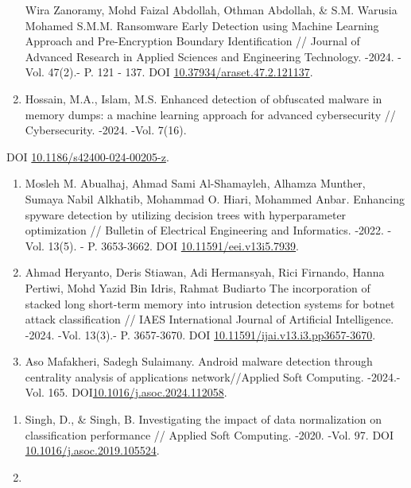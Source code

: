 \begin{references}
\begin{enumerate}
  Wira Zanoramy, Mohd Faizal Abdollah, Othman Abdollah, \& S.M. Warusia
  Mohamed S.M.M. Ransomware Early Detection using Machine Learning
  Approach and Pre-Encryption Boundary Identification // Journal of
  Advanced Research in Applied Sciences and Engineering Technology.
  -2024. -Vol. 47(2).- P. 121 - 137. DOI
  \href{https://doi.org/10.37934/araset.47.2.121137}{10.37934/araset.47.2.121137}.
\item
  Hossain, M.A., Islam, M.S. Enhanced detection of obfuscated malware in
  memory dumps: a machine learning approach for advanced cybersecurity
  // Cybersecurity. -2024. -Vol. 7(16).
\end{enumerate}
DOI \href{https://doi.org/10.1186/s42400-024-00205-z}{10.1186/s42400-024-00205-z}.

\begin{enumerate}
\def\labelenumi{\arabic{enumi}.}
\setcounter{enumi}{8}
\item
  Mosleh M. Abualhaj, Ahmad Sami Al-Shamayleh, Alhamza Munther, Sumaya
  Nabil Alkhatib, Mohammad O. Hiari, Mohammed Anbar\emph{.} Enhancing
  spyware detection by utilizing decision trees with hyperparameter
  optimization // Bulletin of Electrical Engineering and Informatics.
  -2022. -Vol. 13(5). - P. 3653-3662. DOI
  \href{https://doi.org/10.11591/eei.v13i5.7939}{10.11591/eei.v13i5.7939}.
\item
  Ahmad Heryanto, Deris Stiawan, Adi Hermansyah, Rici Firnando, Hanna
  Pertiwi, Mohd Yazid Bin Idris, Rahmat Budiarto The incorporation of
  stacked long short-term memory into intrusion detection systems for
  botnet attack classification // IAES International Journal of
  Artificial Intelligence. -2024. -Vol. 13(3).- P. 3657-3670. DOI
  \href{https://doi.org/10.11591/ijai.v13.i3.pp3657-3670}{10.11591/ijai.v13.i3.pp3657-3670}.
\item
  Aso Mafakheri, Sadegh Sulaimany. Android malware detection through
  centrality analysis of applications network//Applied Soft Computing.
  -2024.-Vol. 165. DOI\href{https://doi.org/10.1016/j.asoc.2024.112058}{10.1016/j.asoc.2024.112058}.
\end{enumerate}
\begin{enumerate}
\def\labelenumi{\arabic{enumi}.}
\setcounter{enumi}{11}
\item
  Singh, D., \& Singh, B. Investigating the impact of data normalization
  on classification performance // Applied Soft Computing. -2020. -Vol.
  97. DOI
  \href{https://doi.org/10.1016/j.asoc.2019.105524}{10.1016/j.asoc.2019.105524}.
\item

\end{enumerate}
\end{references}

